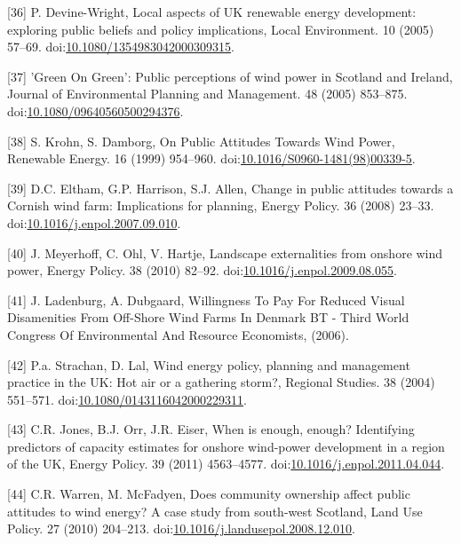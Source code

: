 \documentclass[a4paper,]{article}
\theoremstyle{definition}
\theoremstyle{definition}
\theoremstyle{definition}
\theoremstyle{remark}
\begin{document}
\hypertarget{ref-Devine-Wright2005}{}
{[}36{]} P. Devine-Wright, Local aspects of UK renewable energy
development: exploring public beliefs and policy implications, Local
Environment. 10 (2005) 57--69.
doi:\href{https://doi.org/10.1080/1354983042000309315}{10.1080/1354983042000309315}.

\hypertarget{ref-Warren2005}{}
{[}37{]} 'Green On Green': Public perceptions of wind power in Scotland
and Ireland, Journal of Environmental Planning and Management. 48 (2005)
853--875.
doi:\href{https://doi.org/10.1080/09640560500294376}{10.1080/09640560500294376}.

\hypertarget{ref-Krohn1999}{}
{[}38{]} S. Krohn, S. Damborg, On Public Attitudes Towards Wind Power,
Renewable Energy. 16 (1999) 954--960.
doi:\href{https://doi.org/10.1016/S0960-1481(98)00339-5}{10.1016/S0960-1481(98)00339-5}.

\hypertarget{ref-Eltham2008}{}
{[}39{]} D.C. Eltham, G.P. Harrison, S.J. Allen, Change in public
attitudes towards a Cornish wind farm: Implications for planning, Energy
Policy. 36 (2008) 23--33.
doi:\href{https://doi.org/10.1016/j.enpol.2007.09.010}{10.1016/j.enpol.2007.09.010}.

\hypertarget{ref-Meyerhoff2010}{}
{[}40{]} J. Meyerhoff, C. Ohl, V. Hartje, Landscape externalities from
onshore wind power, Energy Policy. 38 (2010) 82--92.
doi:\href{https://doi.org/10.1016/j.enpol.2009.08.055}{10.1016/j.enpol.2009.08.055}.

\hypertarget{ref-Ladenburg2006}{}
{[}41{]} J. Ladenburg, A. Dubgaard, Willingness To Pay For Reduced
Visual Disamenities From Off-Shore Wind Farms In Denmark BT - Third
World Congress Of Environmental And Resource Economists, (2006).

\hypertarget{ref-Strachan2004}{}
{[}42{]} P.a. Strachan, D. Lal, Wind energy policy, planning and
management practice in the UK: Hot air or a gathering storm?, Regional
Studies. 38 (2004) 551--571.
doi:\href{https://doi.org/10.1080/0143116042000229311}{10.1080/0143116042000229311}.

\hypertarget{ref-Jones2011}{}
{[}43{]} C.R. Jones, B.J. Orr, J.R. Eiser, When is enough, enough?
Identifying predictors of capacity estimates for onshore wind-power
development in a region of the UK, Energy Policy. 39 (2011) 4563--4577.
doi:\href{https://doi.org/10.1016/j.enpol.2011.04.044}{10.1016/j.enpol.2011.04.044}.

\hypertarget{ref-Warren2010}{}
{[}44{]} C.R. Warren, M. McFadyen, Does community ownership affect
public attitudes to wind energy? A case study from south-west Scotland,
Land Use Policy. 27 (2010) 204--213.
doi:\href{https://doi.org/10.1016/j.landusepol.2008.12.010}{10.1016/j.landusepol.2008.12.010}.
\end{document}
